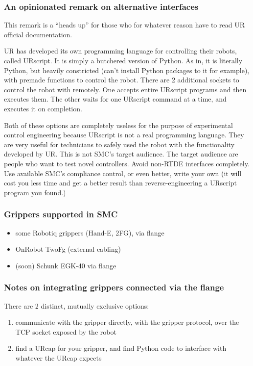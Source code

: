 \subsubsection{An opinionated remark on alternative interfaces}
This remark is a ``heads up'' for those who for whatever reason
have to read UR official documentation.

UR has developed its own programming language for controlling
their robots, called URscript. It is simply a butchered version of Python.
As in, it is literally Python, but heavily constricted (can't install Python packages to it for example),
with premade functions to control the robot.
There are 2 additional sockets to control the robot with remotely.
One accepts entire URscript programs and then executes them.
The other waits for one URscript command at a time, and executes it on completion.

Both of these options are completely useless for the purpose of experimental control engineering
because URscript is not a real programming language.
They are very useful for technicians to safely used the robot with the functionality
developed by UR. This is not SMC's target audience. The target audience are people
who want to test novel controllers.
Avoid non-RTDE interfaces completely. Use available SMC's compliance control, 
or even better, write your own (it will cost you less time and get a better result
than reverse-engineering a URscript program you found.)


\subsubsection{Grippers supported in SMC}
\begin{itemize}
		\item some Robotiq grippers (Hand-E, 2FG), via flange
		\item OnRobot  TwoFg (external cabling)
		\item (soon) Schunk EGK-40 via flange
\end{itemize}

\subsubsection{Notes on integrating grippers connected via the flange}
There are 2 distinct, mutually exclusive options:
\begin{enumerate}
		\item communicate with the gripper directly, with the gripper protocol, over the TCP socket
exposed by the robot
		\item find a URcap for your gripper, and find Python code to interface
			with whatever the URcap expects
\end{enumerate}
